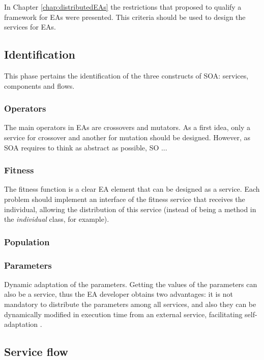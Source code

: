 In Chapter \ref{chap:distributedEAs} the restrictions that  proposed to qualify a framework for EAs were presented. This criteria should be used to design the services for EAs.

\subsection{Identification}
This phase pertains the identification of the three constructs of SOA: services, components and flows.

\subsubsection{Operators} The main operators in EAs are crossovers and mutators. As a first idea, only a service for crossover and another for mutation should be designed. However, as SOA requires to think as abstract as possible, SO ...

\subsubsection{Fitness} The fitness function is a clear EA element that can be designed as a service. Each problem should implement an interface
  of the fitness service that receives the individual, allowing the
  distribution of this service (instead of being a method in the {\em
    individual} class, for example). 


\subsubsection{Population} 

\subsubsection{Parameters}  Dynamic adaptation of the parameters. Getting the values of the parameters can also be a
  service, %
 thus the EA developer obtains two advantages: %
it is not mandatory to distribute the parameters among all services,
 and also they can be dynamically modified in execution time from an external service, facilitating self-adaptation \cite{eiben2005shared}.

\subsection{Service flow} 

